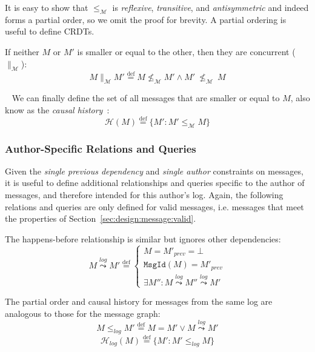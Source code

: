 \documentclass[9pt, oneside]{article}   	%
\newcommand{\defeq}{\overset{\mathrm{def}}{=}}
\newcommand{\anyleadsto}[1]{\overset{#1}\leadsto}
\newcommand{\logleadsto}{\overset{\textit{log}}\leadsto}
\begin{document}
It is easy to show that $\leq_\mathcal{M}$ is \textit{reflexive}, \textit{transitive}, and \textit{antisymmetric} and indeed forms a partial order, so we omit the proof for brevity. A partial ordering is useful to define CRDTs.

If neither $M$ or $M'$ is smaller or equal to the other, then they are concurrent ($\parallel_\mathcal{M}$):
\begin{equation}
	M \parallel_\mathcal{M} M' \defeq M \not\leq_\mathcal{M} M' \wedge M' ~\not\leq_\mathcal{M}~ M
\end{equation}

~\newline
We can finally define the set of all messages that are smaller or equal to $M$, also know as the \textit{causal history}~\cite{schwarz1994detecting}:
\begin{equation}
	\mathcal{H}(M) \defeq \{ M' : M' \leq_\mathcal{M} M \} 
\end{equation}

\subsubsection{Author-Specific Relations and Queries}
\label{sec:design:writer-rel-queries}

Given the \textit{single previous dependency} and \textit{single author} constraints on messages, it is useful to define additional relationships and queries specific to the author of messages, and therefore intended for this author's log. Again, the following relations and queries are only defined for valid messages, i.e. messages that meet the properties of Section~\ref{sec:design:message:valid}.

The happens-before relationship is similar but ignores other dependencies:
\begin{equation}
	M \anyleadsto{\textit{log}} M' \defeq \begin{cases}
		M = M'_\textit{prev} = \bot \\
		\texttt{MsgId}(M) = M'_\textit{prev}  \\
		\exists M'' : M \anyleadsto{\textit{log}} M'' \logleadsto M'
	\end{cases}
\end{equation}

The partial order and causal history for messages from the same log are analogous to those for the message graph:
\begin{equation}
\label{eq:log-message:ordering}
	M \leq_\textit{log} M' \defeq M = M' \vee M \logleadsto M'
\end{equation}
\begin{equation}
	\mathcal{H}_\textit{log}(M) \defeq \{ M' : M' \leq_\textit{log} M \} 
\end{equation}
\end{document}
